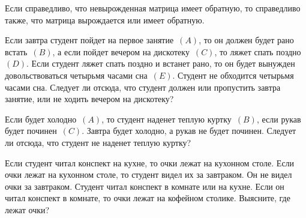 \begin{problemList}
\begin{belarusianEnumerate}
			{Если справедливо, что невырожденная матрица имеет обратную, то справедливо также, что матрица вырождается или имеет обратную.}
		\end{belarusianEnumerate}
		
		\bigskip
		
		{Если завтра студент пойдет на первое занятие~$(A)$, то он должен будет рано встать~$(B)$, а если пойдет вечером на дискотеку~$(C)$, то ляжет спать поздно~$(D)$. Если студент ляжет спать поздно и встанет рано, то он будет вынужден довольствоваться четырьмя часами сна~$(E)$. Студент не обходится четырьмя часами сна. Следует ли отсюда, что студент должен или пропустить завтра занятие, или не ходить вечером на дискотеку?}
		
		\bigskip
		
		{Если будет холодно~$(A)$, то студент наденет теплую куртку~$(B)$, если рукав будет починен~$(C)$. Завтра будет холодно, а рукав не будет починен. Следует ли отсюда, что студент не наденет теплую куртку?}
		
		\bigskip
		
		{Если студент читал конспект на кухне, то очки лежат на кухонном столе. Если очки лежат на кухонном столе, то студент видел их за завтраком. Он не видел очки за завтраком. Студент читал конспект в комнате или на кухне. Если он читал конспект в комнате, то очки лежат на кофейном столике. Выясните, где лежат очки?}
		

\end{problemList}
